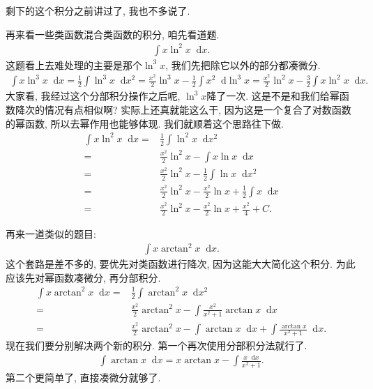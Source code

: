 \documentclass{ctexbook}
\newcommand*{\dif}{\mathop{}\!\mathrm{d}}
\begin{document}
{剩下的这个积分之前讲过了, 我也不多说了. \par
再来看一些\uppercase\expandafter{}类函数混合\uppercase\expandafter{}类函数的积分, 咱先看道题. 
\begin{align*}
\int x\ln^{2}{x}\dif{x}
.\end{align*}
这题看上去难处理的主要是那个$\ln^{3}{x}$, 我们先把除它以外的部分都凑微分. 
\begin{align*}
\int x\ln^{3}{x}\dif{x}=\frac{1}{2}\int\ln^{3}{x}\dif{x^{2}}=\frac{x^{2}}{2}\ln^{3}{x}-\frac{1}{2}\int x^{2}\dif{\ln^{3}{x}}=\frac{x^{2}}{2}\ln^{2}{x}-\frac{3}{2}\int x\ln^{2}{x}\dif{x}
.\end{align*}
大家看, 我经过这个分部积分操作之后呢, $\ln^{3}{x}$降了一次. 这是不是和我们给幂函数降次的情况有点相似啊? 实际上还真就能这么干, 因为这是一个复合了对数函数的幂函数, 所以去幂作用也能够体现. 我们就顺着这个思路往下做. 
\begin{align*}
\int x\ln^{2}{x}\dif{x}={}&\frac{1}{2}\int\ln^{2}{x}\dif{x^{2}}\\
={}&\frac{x^{2}}{2}\ln^{2}{x}-\int x\ln{x}\dif{x}\\
={}&\frac{x^{2}}{2}\ln^{2}{x}-\frac{1}{2}\int\ln{x}\dif{x^{2}}\\
={}&\frac{x^{2}}{2}\ln^{2}{x}-\frac{x^{2}}{2}\ln{x}+\frac{1}{2}\int x\dif{x}\\
={}&\frac{x^{2}}{2}\ln^{2}{x}-\frac{x^{2}}{2}\ln{x}+\frac{x^{2}}{4}+C
.\end{align*}\par
再来一道类似的题目: 
\begin{align*}
\int x\arctan^{2}{x}\dif{x}
.\end{align*}
这个套路是差不多的, 要优先对\uppercase\expandafter{}类函数进行降次, 因为这能大大简化这个积分. 为此应该先对幂函数凑微分, 再分部积分. 
\begin{align*}
\int x\arctan^{2}{x}\dif{x}={}&\frac{1}{2}\int\arctan^{2}{x}\dif{x^{2}}\\
={}&\frac{x^{2}}{2}\arctan^{2}{x}-\int\frac{x^{2}}{x^{2}+1}\arctan{x}\dif{x}\\
={}&\frac{x^{2}}{2}\arctan^{2}{x}-\int\arctan{x}\dif{x}+\int\frac{\arctan{x}}{x^{2}+1}\dif{x}
.\end{align*}
现在我们要分别解决两个新的积分. 第一个再次使用分部积分法就行了. 
\begin{align*}
\int\arctan{x}\dif{x}=x\arctan{x}-\int\frac{x\dif{x}}{x^{2}+1}
.\end{align*}
第二个更简单了, 直接凑微分就够了. 
\begin{align*}

\end{align*}}
\end{document}
